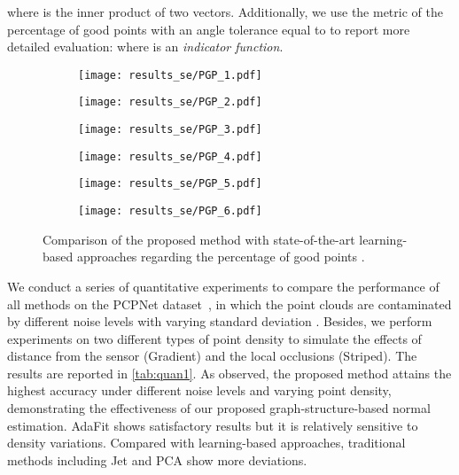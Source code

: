 \documentclass[runningheads]{llncs}
\begin{document}
where  is the inner product of two vectors.
Additionally, we use the metric of the percentage of good points  with an angle tolerance equal to  to report more detailed evaluation:
 where  is an \textit{indicator function}.
\begin{figure}[t]
  \centering
  \begin{subfigure}{0.3\linewidth}
    \texttt{[image: results\_se/PGP\_1.pdf]}
  \end{subfigure}
  \begin{subfigure}{0.3\linewidth}
    \texttt{[image: results\_se/PGP\_2.pdf]}
  \end{subfigure}
  \begin{subfigure}{0.3\linewidth}
    \texttt{[image: results\_se/PGP\_3.pdf]}
  \end{subfigure}
  \begin{subfigure}{0.3\linewidth}
    \texttt{[image: results\_se/PGP\_4.pdf]}
  \end{subfigure}
  \begin{subfigure}{0.3\linewidth}
    \texttt{[image: results\_se/PGP\_5.pdf]}
  \end{subfigure}
  \begin{subfigure}{0.3\linewidth}
    \texttt{[image: results\_se/PGP\_6.pdf]}
  \end{subfigure}
  \caption{Comparison of the proposed method with state-of-the-art learning-based approaches regarding the percentage of good points .
}
\label{fig:pgp}
\end{figure}


We conduct a series of quantitative experiments to compare the performance of all methods on the PCPNet dataset~\cite{guerrero2018pcpnet}, in which the point clouds are contaminated by different noise levels with varying standard deviation . Besides, we perform experiments on two different types of point density to simulate the effects of distance from the sensor (Gradient) and the local occlusions (Striped). The results are reported in \cref{tab:quan1}. As observed, the proposed method attains the highest accuracy under different noise levels and varying point density, demonstrating the effectiveness of our proposed graph-structure-based normal estimation. AdaFit shows satisfactory results but it is relatively sensitive to density variations. Compared with learning-based approaches, traditional methods including Jet and PCA show more deviations. 
\end{document}
